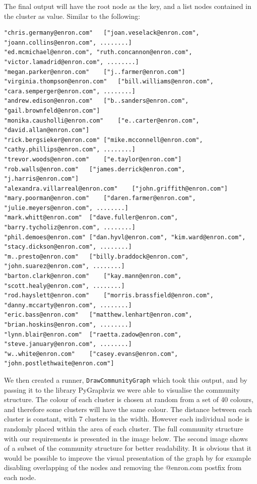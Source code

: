\documentclass[runningheads,a4paper]{llncs}
\begin{document}
The final output will have the root node as the key, and a list nodes contained in the cluster as value. Similar to the following:
\begin{verbatim}
"chris.germany@enron.com"	["joan.veselack@enron.com", "joann.collins@enron.com", ........]
"ed.mcmichael@enron.com", "ruth.concannon@enron.com", "victor.lamadrid@enron.com", ........]
"megan.parker@enron.com"	["j..farmer@enron.com"]
"virginia.thompson@enron.com"	["bill.williams@enron.com", "cara.semperger@enron.com", ........]
"andrew.edison@enron.com"	["b..sanders@enron.com", "gail.brownfeld@enron.com"]
"monika.causholli@enron.com"	["e..carter@enron.com", "david.allan@enron.com"]
"rick.bergsieker@enron.com"	["mike.mcconnell@enron.com", "cathy.phillips@enron.com", ........]
"trevor.woods@enron.com"	["e.taylor@enron.com"]
"rob.walls@enron.com"	["james.derrick@enron.com", "j.harris@enron.com"]
"alexandra.villarreal@enron.com"	["john.griffith@enron.com"]
"mary.poorman@enron.com"	["daren.farmer@enron.com", "julie.meyers@enron.com", ........]
"mark.whitt@enron.com"	["dave.fuller@enron.com", "barry.tycholiz@enron.com", ........]
"phil.demoes@enron.com"	["dan.hyvl@enron.com", "kim.ward@enron.com", "stacy.dickson@enron.com", ........]
"m..presto@enron.com"	["billy.braddock@enron.com", "john.suarez@enron.com", ........]
"barton.clark@enron.com"	["kay.mann@enron.com", "scott.healy@enron.com", ........]
"rod.hayslett@enron.com"	["morris.brassfield@enron.com", "danny.mccarty@enron.com", ........]
"eric.bass@enron.com"	["matthew.lenhart@enron.com", "brian.hoskins@enron.com", ........]
"lynn.blair@enron.com"	["raetta.zadow@enron.com", "steve.january@enron.com", ........]
"w..white@enron.com"	["casey.evans@enron.com", "john.postlethwaite@enron.com"]
\end{verbatim}

We then created a runner, \verb!DrawCommunityGraph! which took this output, and by passing it to the library PyGraphviz we were able to visualise the community structure. The colour of each cluster is chosen at random from a set of 40 colours, and therefore some clusters will have the same colour. The distance between each cluster is constant, with 7 clusters in the width. However each individual node is randomly placed within the area of each cluster.
The full community structure with our requirements is presented in the image below. The second image shows of a subset of the community structure for better readability. It is obvious that it would be possible to improve the visual presentation of the graph by for example disabling overlapping of the nodes and removing the @enron.com postfix from each node.
\end{document}
